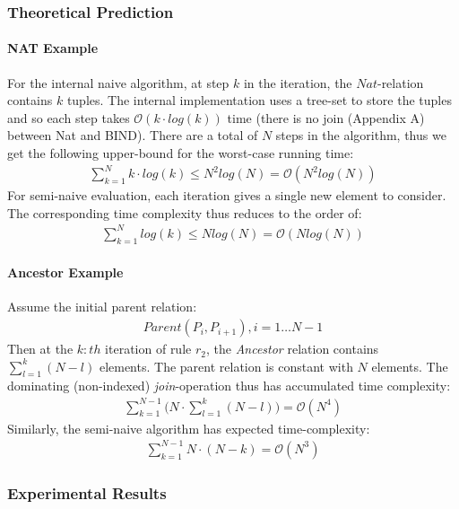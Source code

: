 \subsubsection{Theoretical Prediction}

\paragraph{NAT Example}\NL
For the internal naive algorithm, at step $k$ in the iteration, the $Nat$-relation contains $k$ tuples. The internal implementation uses a tree-set to store the tuples and so each step takes $\mathcal{O}(k \cdot log(k))$ time (there is no join (Appendix A) between Nat and BIND). There are a total of $N$ steps in the algorithm, thus we get the following upper-bound for the worst-case running time:
\begin{align*}
\sum_{k = 1}^{N}k \cdot log (k) \leq N^2 log(N) = \mathcal{O}(N^2 log(N))
\end{align*}
For semi-naive evaluation, each iteration gives a single new element to consider. The corresponding time complexity thus reduces to the order of:
\begin{align*}
	\sum_{k = 1}^{N} log (k) \leq N log(N) = \mathcal{O}(N log(N))
\end{align*}

\paragraph{Ancestor Example}\NL
Assume the initial parent relation: 
\begin{align*}
Parent(P_i, P_{i + 1}), i = 1\ldots N - 1
\end{align*}
\noindent
Then at the $k:th$ iteration of rule $r_2$, the \textit{Ancestor} relation contains $\sum_{l = 1}^{k} (N - l)$ elements. The parent relation is constant with $N$ elements. The dominating (non-indexed) \textit{join}-operation thus has accumulated time complexity:
\begin{align*}
\sum_{k = 1}^{N - 1} \Big (N \cdot \sum_{l = 1}^{k} (N - l)\Big) = \mathcal{O}(N^4)
\end{align*}
\noindent
Similarly, the semi-naive algorithm has expected time-complexity:
\begin{align*}
\sum_{k = 1}^{N - 1} N \cdot (N - k) = \mathcal{O}(N^3)
\end{align*}


\subsubsection{Experimental Results}

